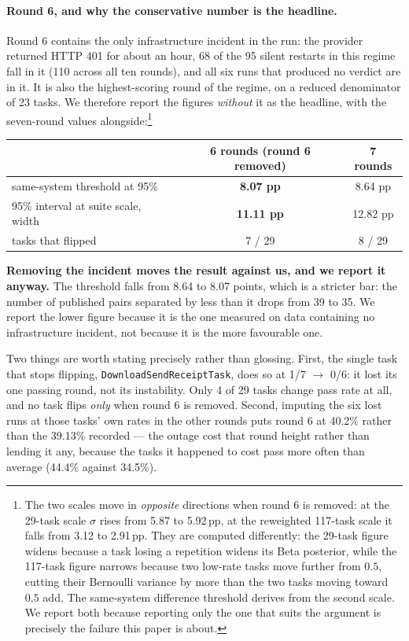 \paragraph{Round 6, and why the conservative number is the headline.} Round 6
contains the only infrastructure incident in the run: the provider returned
HTTP 401 for about an hour, 68 of the 95 silent restarts in this regime fall in it (110 across all ten rounds), and
all six runs that produced no verdict are in it. It is also the highest-scoring
round of the regime, on a reduced denominator of 23 tasks. We therefore report
the figures \emph{without} it as the headline, with the seven-round values
alongside:\footnote{The two scales move in \emph{opposite} directions when round
6 is removed: at the 29-task scale $\sigma$ rises from 5.87 to 5.92\,pp, at the
reweighted 117-task scale it falls from 3.12 to 2.91\,pp. They are computed
differently: the 29-task figure widens because a task losing a repetition widens
its Beta posterior, while the 117-task figure narrows because two low-rate tasks
move further from $0.5$, cutting their Bernoulli variance by more than the two
tasks moving toward $0.5$ add. The same-system difference threshold derives
from the second scale. We report both because
reporting only the one that suits the argument is precisely the failure this
paper is about.}

\begin{center}\small
\begin{tabular}{lcc}
\toprule
 & 6 rounds (round 6 removed) & 7 rounds \\
\midrule
same-system threshold at 95\% & \textbf{8.07 pp} & 8.64 pp \\
95\% interval at suite scale, width & \textbf{11.11 pp} & 12.82 pp \\
tasks that flipped & 7 / 29 & 8 / 29 \\
\bottomrule
\end{tabular}
\end{center}

\textbf{Removing the incident moves the result against us, and we report it
anyway.} The threshold falls from 8.64 to 8.07 points, which is a stricter bar:
the number of published pairs separated by less than it drops from 39 to 35.
We report the lower figure because it is the one measured on data containing no
infrastructure incident, not because it is the more favourable one.

Two things are worth stating precisely rather than glossing. First, the single
task that stops flipping, \texttt{DownloadSendReceiptTask}, does so at 1/7
$\rightarrow$ 0/6: it lost its one passing round, not its instability. Only 4 of
29 tasks change pass rate at all, and no task flips \emph{only} when round 6 is
removed. Second, imputing the six lost runs at those tasks' own rates in the
other rounds puts round 6 at 40.2\% rather than the 39.13\% recorded --- the
outage cost that round height rather than lending it any, because the tasks it
happened to cost pass more often than average (44.4\% against 34.5\%).



